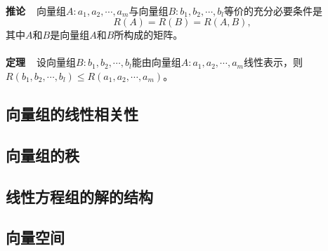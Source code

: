 \paragraph{}
\textbf{推论~~}向量组$A:a_1,a_2,\cdots,a_m$与向量组$B:b_1,b_2,\cdots,b_l$等价的充分必要条件是
\begin{equation*}
  R(A)=R(B)=R(A,B),
\end{equation*}
其中$A$和$B$是向量组$A$和$B$所构成的矩阵。

\paragraph{}
\textbf{定理~~}设向量组$B: b_1,b_2,\cdots,b_l$能由向量组$A:a_1,a_2,\cdots,a_m$线性表示，则\\$R(b_1,b_2,\cdots,b_l)\leq R(a_1,a_2,\cdots,a_m)$。

\subsection{向量组的线性相关性}
\paragraph{}

\subsection{向量组的秩}
\paragraph{}

\subsection{线性方程组的解的结构}
\paragraph{}

\subsection{向量空间}
\paragraph{}

